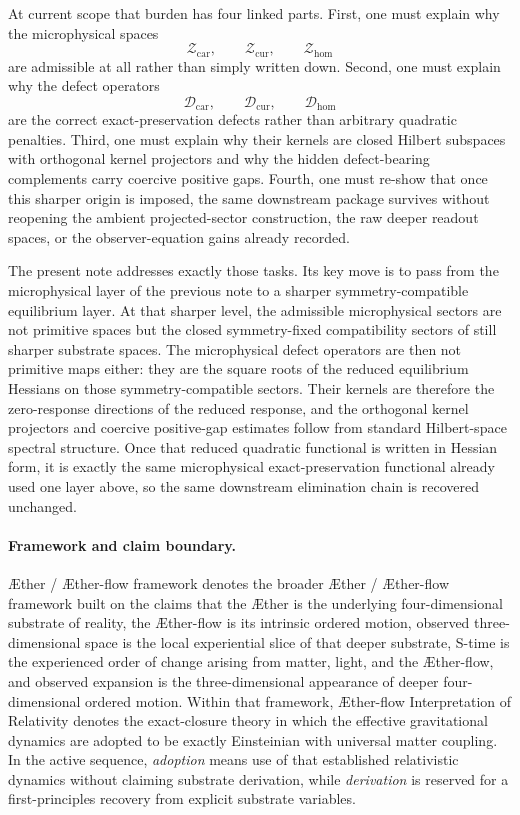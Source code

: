 \documentclass[11pt]{article}
\newcommand{\Aether}{\AE{}ther}
\newcommand{\Aflow}{\AE{}ther-flow}
\newcommand{\TheoryName}{\Aflow{} Interpretation of Relativity}
\newcommand{\TheoryProgram}{\Aether{} / \Aflow{} framework}
\newcommand{\UltraTensorClass}{\mathscr Z_{\mathrm{car}}}
\newcommand{\UltraRelabelClass}{\mathscr Z_{\mathrm{cur}}}
\newcommand{\UltraFreeClass}{\mathscr Z_{\mathrm{hom}}}
\newcommand{\TensorDefect}{\mathcal D_{\mathrm{car}}}
\newcommand{\CurDefect}{\mathcal D_{\mathrm{cur}}}
\newcommand{\HomDefect}{\mathcal D_{\mathrm{hom}}}
\begin{document}
At current scope that burden has four linked parts. First, one must explain why the microphysical spaces
\[
\UltraTensorClass,\qquad
\UltraRelabelClass,\qquad
\UltraFreeClass
\]
are admissible at all rather than simply written down. Second, one must explain why the defect operators
\[
\TensorDefect,\qquad
\CurDefect,\qquad
\HomDefect
\]
are the correct exact-preservation defects rather than arbitrary quadratic penalties. Third, one must explain why their kernels are closed Hilbert subspaces with orthogonal kernel projectors and why the hidden defect-bearing complements carry coercive positive gaps. Fourth, one must re-show that once this sharper origin is imposed, the same downstream package survives without reopening the ambient projected-sector construction, the raw deeper readout spaces, or the observer-equation gains already recorded.

The present note addresses exactly those tasks. Its key move is to pass from the microphysical layer of the previous note to a sharper symmetry-compatible equilibrium layer. At that sharper level, the admissible microphysical sectors are not primitive spaces but the closed symmetry-fixed compatibility sectors of still sharper substrate spaces. The microphysical defect operators are then not primitive maps either: they are the square roots of the reduced equilibrium Hessians on those symmetry-compatible sectors. Their kernels are therefore the zero-response directions of the reduced response, and the orthogonal kernel projectors and coercive positive-gap estimates follow from standard Hilbert-space spectral structure. Once that reduced quadratic functional is written in Hessian form, it is exactly the same microphysical exact-preservation functional already used one layer above, so the same downstream elimination chain is recovered unchanged.

\paragraph{Framework and claim boundary.}
\TheoryProgram{} denotes the broader \Aether{} / \Aflow{} framework built on the claims that the \Aether{} is the underlying four-dimensional substrate of reality, the \Aflow{} is its intrinsic ordered motion, observed three-dimensional space is the local experiential slice of that deeper substrate, S-time is the experienced order of change arising from matter, light, and the \Aflow{}, and observed expansion is the three-dimensional appearance of deeper four-dimensional ordered motion. Within that framework, \TheoryName{} denotes the exact-closure theory in which the effective gravitational dynamics are adopted to be exactly Einsteinian with universal matter coupling. In the active sequence, \emph{adoption} means use of that established relativistic dynamics without claiming substrate derivation, while \emph{derivation} is reserved for a first-principles recovery from explicit substrate variables.
\end{document}
